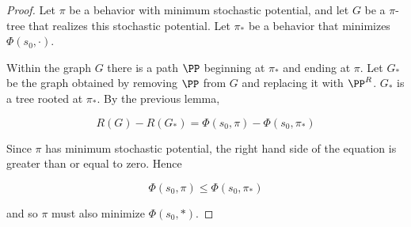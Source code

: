 \begin{proof}
Let $\pi$ be a behavior with minimum stochastic potential, and let $G$ be a $\pi$-tree that realizes this stochastic potential. Let $\pi_*$ be a behavior that minimizes $\Phi(s_0, \cdot)$.

Within the graph $G$ there is a path $\PP$ beginning at $\pi_*$ and ending at $\pi$. Let $G_*$ be the graph obtained by removing $\PP$ from $G$ and replacing it with $\PP^R$. $G_*$ is a tree rooted at $\pi_*$. By the previous lemma,

$$
R(G) - R(G_*) = \Phi(s_0, \pi) - \Phi(s_0, \pi_*)
$$

Since $\pi$ has minimum stochastic potential, the right hand side of the equation is greater than or equal to zero. Hence

$$
\Phi(s_0, \pi) \leq \Phi(s_0, \pi_*)
$$

and so $\pi$ must also minimize $\Phi(s_0, *)$.
\end{proof}